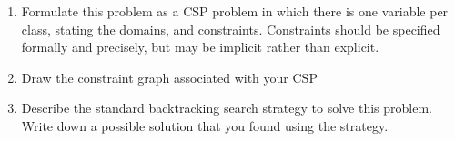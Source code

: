 \documentclass[a4paper]{article}
\newif\ifsol
\begin{document}
\begin{enumerate}
\item Formulate this problem as a CSP  problem in which there is one variable per class, stating the domains, and constraints. Constraints should be specified formally and precisely, but may be implicit rather than explicit.

\ifsol
\textcolor{blue}{
    The following list first shows the variable and then the domains:
    \begin{itemize}
    \item $CS50$ - $\{A, C\}$
    \item $CS124$ - $\{B, C\}$
    \item $CS181$ - $\{A, B\}$
    \item $CS182$ - $\{A\}$
    \item $CS187$ - $\{B, C\}$
    \end{itemize}
    Implicit constraints: $\{CS50 \neq CS182, CS124 \neq CS182, CS124 \neq CS187, CS182 \neq CS187\}$
    }
\else
    \vspace{12em}
\fi


\item Draw the constraint graph associated with your CSP

\ifsol
    \vspace{1em}
    \begin{tikzpicture}[
            shorten >=1pt, auto, thick,
            node distance=2.5cm,
        main node/.style={circle,draw,fill=blue!20,font=\sffamily\Large\bfseries}
                                ]
          \node[main node] (a) at (0,0) {~50};
          \node[main node] (b) at (3,0) {124};
          \node[main node] (c) at (6,0) {181};
          \node[main node] (d) at (0,-3) {182};
          \node[main node] (e) at (3,-3) {187};
    
          \path[every node/.style={font=\sffamily\small}]
            (a) edge node {} (d)
            (b) edge node {} (d)
            (b) edge node {} (e)
            (d) edge node {} (e);
    \end{tikzpicture}
    \vspace{1em}
\else
    \vspace{12em}
    \pagebreak
\fi


\item Describe the standard backtracking search strategy to solve this problem. Write down a possible solution that you found using the strategy. 


\end{enumerate}
\end{document}
